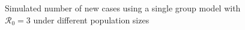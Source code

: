 \documentclass[12pt]{article}
\begin{document}
\begin{figure}[t]%
\caption
{Simulated number of new cases using a single group model with ${\mathcal
{R}_0}=3$ under different population sizes}%
\vspace{-0.2cm}%
\label{fig: diff_n}%

\begin{footnotesize}%



\end{footnotesize}
\end{figure}
\end{document}
